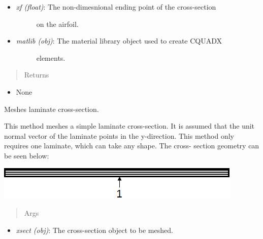 \documentclass[letterpaper,10pt,english]{sphinxmanual}
\begin{document}
\begin{fulllineitems}
\begin{fulllineitems}
\begin{itemize}
\begin{description}
\end{description}

\item {} \begin{description}
\item[{\emph{xf (float)}: The non-dimesnional ending point of the cross-section}] \leavevmode
on the airfoil.

\end{description}

\item {} \begin{description}
\item[{\emph{matlib (obj)}: The material library object used to create CQUADX}] \leavevmode
elements.

\end{description}

\end{itemize}
\begin{quote}\begin{description}
\item[{Returns}] \leavevmode
\end{description}\end{quote}
\begin{itemize}
\item {} 
None

\end{itemize}

\end{fulllineitems}


\begin{fulllineitems}
\label{structures:AeroComBAT.Structures.Mesher.laminate}
Meshes laminate cross-section.

This method meshes a simple laminate cross-section. It is assumed that
the unit normal vector of the laminate points in the y-direction. This
method only requires one laminate, which can take any shape. The cross-
section geometry can be seen below:

{\hfill\includegraphics{laminateGeom.png}\hfill}
\begin{quote}\begin{description}
\item[{Args}] \leavevmode
\end{description}\end{quote}
\begin{itemize}
\item {} 
\emph{xsect (obj)}: The cross-section object to be meshed.


\end{itemize}
\end{fulllineitems}
\end{fulllineitems}
\end{document}
